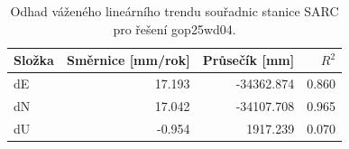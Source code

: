 \begin{table}[htbp]
\caption{Odhad váženého lineárního trendu souřadnic stanice SARC pro řešení gop25wd04.}
\label{tab:gop25wd04_stcd_sarc_weighted_1seg}
\begin{tabular}{lrrr}
\toprule
Složka & Směrnice [mm/rok] & Průsečík [mm] & $R^2$ \\
\midrule
dE & 17.193 & -34362.874 & 0.860 \\
dN & 17.042 & -34107.708 & 0.965 \\
dU & -0.954 & 1917.239 & 0.070 \\
\bottomrule
\end{tabular}
\end{table}

